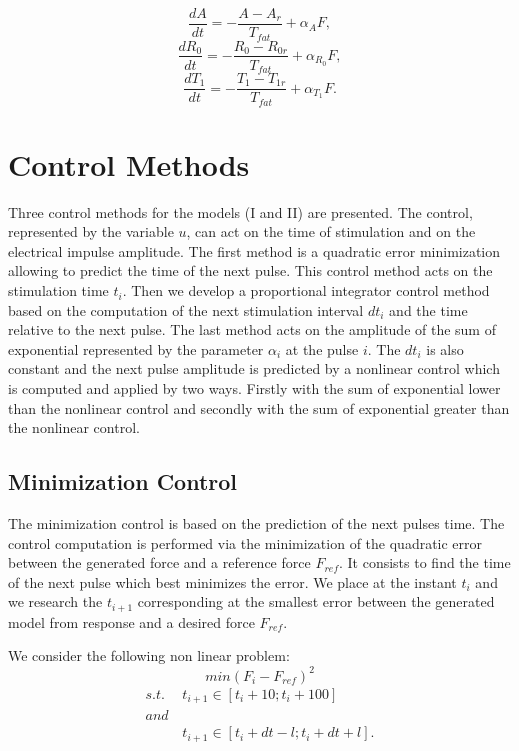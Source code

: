\documentclass[10pt,twocolumn,letterpaper, 
]{article}
\begin{document}
\begin{equation}
\frac{dA}{dt}=-\frac{A-{A_r}}{T_{fat}}+\alpha_A F ,
\end{equation}
\begin{equation}
\frac{dR_0}{dt}=-\frac{R_0-R_{0r}}{T_{fat}}+\alpha_{R_0} F ,
\end{equation}
\begin{equation}
\frac{dT_1}{dt}=-\frac{T_1-T_{1r}}{T_{fat}}+\alpha_{T_1} F .
\end{equation}

\section{Control Methods}

Three control methods for the models (I and II) are presented. The control, represented by the variable $u$, can act on the time of stimulation and on the electrical impulse amplitude. The first method is a quadratic error minimization allowing to predict the time of the next pulse. This control method acts on the stimulation time $t_i$. Then we develop a proportional integrator control method based on the computation of the next stimulation interval $dt_i$ and the time relative to the next pulse. The last method acts on the amplitude of the sum of exponential represented by the parameter $\alpha_i$ at the pulse $i$. The $dt_i$ is also constant and the next pulse amplitude is predicted by a nonlinear control which is computed and applied by two ways. Firstly with the sum of exponential lower than the nonlinear control and secondly with the sum of exponential greater than the nonlinear control.

\subsection{Minimization Control}

  The minimization control is based on the prediction of the next pulses time. The control computation is performed via the minimization of the quadratic error between the generated force and a reference force $F_{ref}$. It consists to find the time of the next pulse which best minimizes the error. We place at the instant $t_i$ and we research the $t_{i+1}$ corresponding at the smallest error between the generated model from response and a desired force $F_{ref}$. 
	
	We consider the following non linear problem: 
		\begin{equation}
			min  (F_i - F_{ref})^2 
		\end{equation}		
\begin{align}
\textit{s.t.} \ \ & t_{i+1} \in [t_i+10 ; t_i+100] \nonumber \\ 
\textit{and}\nonumber \\ \nonumber
& t_{i+1} \in [t_i+dt-l ; t_i+dt+l].
\end{align}
\end{document}
